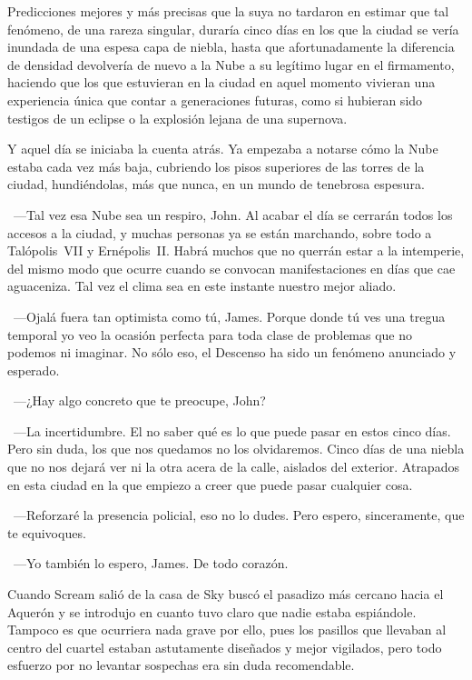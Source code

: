 Predicciones mejores y más precisas que la suya no tardaron en estimar que tal fenómeno, de una rareza singular, duraría cinco días en los que la ciudad se vería inundada de una espesa capa de niebla, hasta que afortunadamente la diferencia de densidad devolvería de nuevo a la Nube a su legítimo lugar en el firmamento, haciendo que los que estuvieran en la ciudad en aquel momento vivieran una experiencia única que contar a generaciones futuras, como si hubieran sido testigos de un eclipse o la explosión lejana de una supernova.

Y aquel día se iniciaba la cuenta atrás. Ya empezaba a notarse cómo la Nube estaba cada vez más baja, cubriendo los pisos superiores de las torres de la ciudad, hundiéndolas, más que nunca, en un mundo de tenebrosa espesura.

~---Tal vez esa Nube sea un respiro, John. Al acabar el día se cerrarán todos los accesos a la ciudad, y muchas personas ya se están marchando, sobre todo a Talópolis~VII y Ernépolis~II. Habrá muchos que no querrán estar a la intemperie, del mismo modo que ocurre cuando se convocan manifestaciones en días que cae aguaceniza. Tal vez el clima sea en este instante nuestro mejor aliado.

~---Ojalá fuera tan optimista como tú, James. Porque donde tú ves una tregua temporal yo veo la ocasión perfecta para toda clase de problemas que no podemos ni imaginar. No sólo eso, el Descenso ha sido un fenómeno anunciado y esperado.

~---¿Hay algo concreto que te preocupe, John?

~---La incertidumbre. El no saber qué es lo que puede pasar en estos cinco días. Pero sin duda, los que nos quedamos no los olvidaremos. Cinco días de una niebla que no nos dejará ver ni la otra acera de la calle, aislados del exterior. Atrapados en esta ciudad en la que empiezo a creer que puede pasar cualquier cosa.

~---Reforzaré la presencia policial, eso no lo dudes. Pero espero, sinceramente, que te equivoques.

~---Yo también lo espero, James. De todo corazón.

\bigskip\noindent
Cuando Scream salió de la casa de Sky buscó el pasadizo más cercano hacia el Aquerón y se introdujo en cuanto tuvo claro que nadie estaba espiándole. Tampoco es que ocurriera nada grave por ello, pues los pasillos que llevaban al centro del cuartel estaban astutamente diseñados y mejor vigilados, pero todo esfuerzo por no levantar sospechas era sin duda recomendable.

